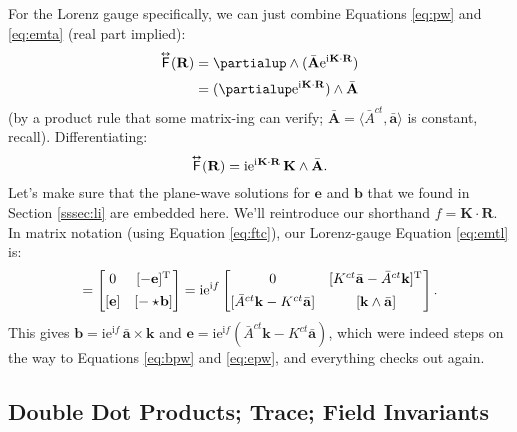 \documentclass[12pt]{article}
\renewcommand{\vv}[1]{\mathbf{#1}}
\newcommand{\capdy}[1]{ \overset{ \text{\tiny$\bm\leftrightarrow$} }{\vphantom{\text{\small{A}}}\smash{#1}} }
\begin{document}
For the Lorenz gauge specifically, we can just combine Equations \ref{eq:pw} and \ref{eq:emta} (real part implied):
\begin{equation*}
\begin{split}
\capdy{\mathsf{F}} (\vv R) &= \partialup \wedge (  \bar{\vv A} \mathrm{e}^{\mathrm{i} \mkern.5mu \vv K \cdot \vv R} ) \\[2pt]
&= ( \partialup \mathrm{e}^{\mathrm{i} \mkern.5mu \vv K \cdot \vv R} ) \wedge \bar{\vv A}
\end{split}
\end{equation*}
(by a product rule that some matrix-ing can verify; $\bar{\vv A} = \langle \bar{A}^{ct}, \bar{\vv a} \rangle$ is constant, recall). Differentiating:
\begin{equation}\label{eq:emtl}
\capdy{\mathsf{F}} (\vv R) = \mathrm{i} \mathrm{e}^{\mathrm{i} \mkern.5mu \vv K \cdot \vv R} \, \vv K \wedge \bar{\vv A} .
\end{equation}
Let's make sure that the plane-wave solutions for $\vv e$ and $\vv b$ that we found in Section \ref{sssec:li} are embedded here. We'll reintroduce our shorthand $f = \vv K \cdot \vv R$. In matrix notation (using Equation \ref{eq:ftc}), our Lorenz-gauge Equation \ref{eq:emtl} is:
\begin{equation*}
[ \capdy{\mathsf{F}} ]
=
\begin{bmatrix}
0 & [ - \vv e]^\mathrm{T} \\[1ex]
[\vv e] & [ - \star \mkern-3mu \vv b ]
\end{bmatrix}
=
\mathrm{i} \mathrm{e}^{\mathrm{i} f}
\begin{bmatrix}
0 & [K^{ct} \bar{\vv a} - \bar{A}^{ct} \vv k ]^\mathrm{T} \mkern1mu \\[1ex]
[\bar{A}^{ct} \vv k - K^{ct} \bar{\vv a}] & [ \vv k \wedge \bar{\vv a} ] 
\end{bmatrix} .
\end{equation*}
This gives $\vv b = \mathrm{i} \mathrm{e}^{\mathrm{i} f} \, \bar{\vv a} \times \vv k$ and $\vv e = \mathrm{i} \mathrm{e}^{\mathrm{i} f} ( \bar{A}^{ct} \vv k - K^{ct} \bar{\vv a} )$, which were indeed steps on the way to Equations \ref{eq:bpw} and \ref{eq:epw}, and everything checks out again.


\subsection{Double Dot Products; Trace; Field Invariants}\label{ssec:dd}
\end{document}
